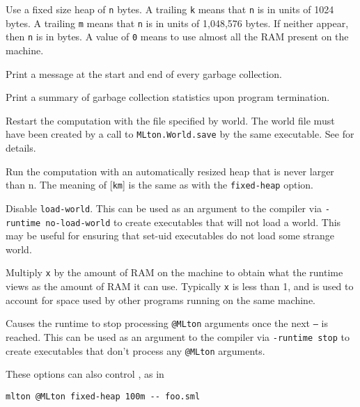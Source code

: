 \begin{description}
 Use a fixed size heap of {\tt n} bytes.
 A trailing {\tt k} means that {\tt n} is in units of 1024 bytes. 
 A trailing {\tt m} means that {\tt n} is in units of 1,048,576 bytes. 
 If neither appear, then {\tt n} is in bytes.
 A value of {\tt 0} means to use almost all the RAM present on the
 machine.

Print a message at the start and end of every garbage collection.

Print a summary of garbage collection statistics upon program
termination.

Restart the computation with the file specified by world.
The world file must have been created by a call to
{\tt MLton.World.save} by the same executable.  See 
for details.

Run the computation with an automatically resized heap that is never
larger than n.  The meaning of [{\tt km}] is the same as with the
{\tt fixed-heap} option.

Disable {\tt load-world}.  This can be used as an argument to the
compiler via {\tt -runtime no-load-world} to create executables that
will not load a world.  This may be useful for ensuring that set-uid
executables do not load some strange world.

Multiply {\tt x} by the amount of RAM on the machine to obtain what
the runtime views as the amount of RAM it can use.  Typically {\tt x}
is less than 1, and is used to account for space used by other
programs running on the same machine.

Causes the runtime to stop processing {\tt @MLton} arguments once the
next {\tt --} is reached.  This can be used as an argument to the
compiler via {\tt -runtime stop} to create executables that don't
process any {\tt @MLton} arguments.
\end{description}
These options can also control {\mlton}, as in
\begin{verbatim}
mlton @MLton fixed-heap 100m -- foo.sml
\end{verbatim}
